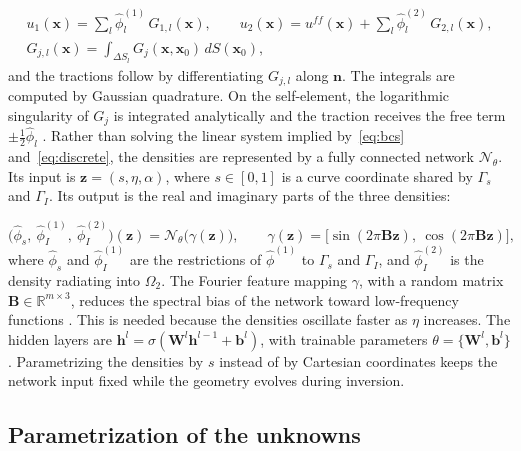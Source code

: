 \documentclass[11pt,twoside]{article}
\begin{document}
\begin{equation}\label{eq:discrete}
  \begin{gathered}
  u_1(\mathbf{x}) = \sum_{l} \hat\phi^{(1)}_l\, G_{1,l}(\mathbf{x}),\qquad
  u_2(\mathbf{x}) = u^{f\!f}(\mathbf{x}) + \sum_{l} \hat\phi^{(2)}_l\, G_{2,l}(\mathbf{x}),\\
  G_{j,l}(\mathbf{x}) = \int_{\Delta S_l} G_j(\mathbf{x},\mathbf{x}_0)\, dS(\mathbf{x}_0),
  \end{gathered}
\end{equation}
and the tractions follow by differentiating $G_{j,l}$ along $\mathbf{n}$. The
integrals are computed by Gaussian quadrature. On the self-element, the
logarithmic singularity of $G_j$ is integrated analytically and the traction
receives the free term $\pm\tfrac12\hat\phi_l$ \citep{SanchezSesma1991}. Rather than solving the linear system implied by~\eqref{eq:bcs}
and~\eqref{eq:discrete}, the densities are represented by a fully connected
network $\mathcal{N}_\theta$. Its input is $\mathbf{z} = (s,\eta,\alpha)$, where
$s\in[0,1]$ is a curve coordinate shared by $\Gamma_s$ and $\Gamma_I$. Its
output is the real and imaginary parts of the three densities:

\begin{equation}
  \bigl(\hat\phi_s,\ \hat\phi_I^{(1)},\ \hat\phi_I^{(2)}\bigr)(\mathbf{z})
  = \mathcal{N}_\theta\bigl(\gamma(\mathbf{z})\bigr),
  \qquad
  \gamma(\mathbf{z}) = \bigl[\sin(2\pi\mathbf{B}\mathbf{z}),\ \cos(2\pi\mathbf{B}\mathbf{z})\bigr],
\end{equation}
where $\hat\phi_s$ and $\hat\phi_I^{(1)}$ are the restrictions of
$\hat\phi^{(1)}$ to $\Gamma_s$ and $\Gamma_I$, and $\hat\phi_I^{(2)}$ is the
density radiating into $\Omega_2$. The Fourier feature mapping $\gamma$, with a
random matrix $\mathbf{B}\in\mathbb{R}^{m\times 3}$, reduces the spectral bias
of the network toward low-frequency functions \citep{Tancik2020}. This is needed
because the densities oscillate faster as $\eta$ increases. The hidden layers
are $\mathbf{h}^l = \sigma(\mathbf{W}^l\mathbf{h}^{l-1} + \mathbf{b}^l)$, with
trainable parameters $\theta = \{\mathbf{W}^l,\mathbf{b}^l\}$. Parametrizing the
densities by $s$ instead of by Cartesian coordinates keeps the network input
fixed while the geometry evolves during inversion.

\subsection{Parametrization of the unknowns}
\end{document}
